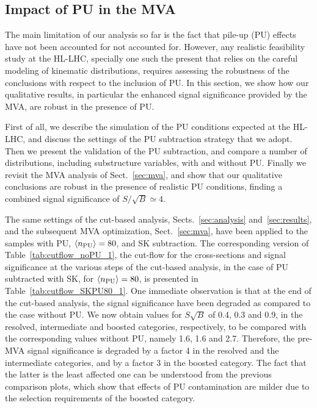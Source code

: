 \subsection{Impact of PU in the MVA}

The main limitation of our analysis so far is the fact that
pile-up (PU) effects have not been accounted for
not accounted for.
%
However, any realistic feasibility study at the HL-LHC, specially
one 
such the present that relies on the careful modeling
of kinematic distributions,
requires assessing the robustness of the conclusions
with respect to the inclusion of PU.
%
In this section, we show how our qualitative results, in particular
the enhanced signal significance provided by the MVA, are robust
in the presence of  PU.

First of all, we describe the simulation of the 
PU conditions  expected at the HL-LHC, and discuss the settings of
the PU subtraction strategy that we adopt.
%
Then we present the validation of the PU subtraction,
and compare a number of distributions, including substructure variables,
with and without PU.
%
Finally we revisit the MVA analysis of Sect.~\ref{sec:mva}, and
show that our qualitative conclusions are robust
in the presence of realistic PU conditions, finding
a combined
signal significance of $S/\sqrt{B}\simeq 4$.

The same settings of the cut-based analysis,
Sects.~\ref{sec:analysis} and~\ref{sec:results}, and
the subsequent MVA optimization, Sect.~\ref{sec:mva}, have
been applied to the samples with PU, $\left\langle n_{\rm PU}\right\rangle=80$,
and SK subtraction.
%
The corresponding version of Table~\ref{tab:cutflow_noPU_1}, the 
cut-flow for the cross-sections and signal significance at the various
steps of the cut-based analysis, 
in the case
of PU subtracted with SK, for $\left\langle n_{\rm PU}\right\rangle=80$,
is presented in Table~\ref{tab:cutflow_SKPU80_1}.
%
One immediate observation is that
at the end of the cut-based analysis,
the signal significance have been  degraded
as compared to the case without PU.
%
We now obtain values for $S\sqrt{B}$ of 0.4, 0.3 and 0.9, in the resolved,
intermediate and boosted categories, respectively, to be compared
with the corresponding values without PU, namely 1.6, 1.6 and 2.7.
%
Therefore, the pre-MVA signal significance is degraded by a factor 4 in
the resolved and the intermediate categories,
and by a factor 3 in the boosted category.
%
The fact that the latter is the  least affected one
can be understood from the previous comparison
plots, which show that effects of PU contamination
are milder due to the  selection requirements
of the boosted category.

